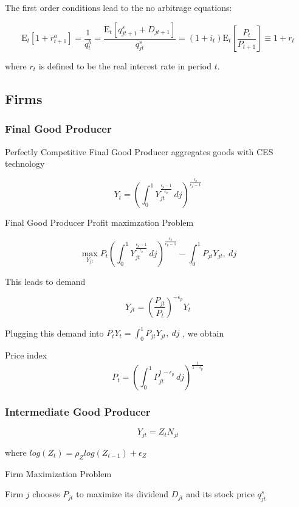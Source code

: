\documentclass[titlepage]{\econtex}\providecommand{\texname}{BufferStockTheory}
\begin{document}
 
The first order conditions lead to the no arbitrage equations:

$$ \mathrm{E}_{t}\left[1+r^{a}_{t+1}\right]= \frac{1}{q^{b}_{t}}  =\frac{\mathrm{E}_{t}\left[q^{s}_{jt+1} + D_{jt+1} \right]}{q^{s}_{jt}} = (1+i_{t}) \mathrm{E}_{t}\left[\frac{P_{t}}{P_{t+1}}\right] \equiv 1 +r_{t}$$

where $r_{t}$ is defined to be the real interest rate in period $t$. 

\hypertarget{Firms}{}
\subsection{Firms}

\hypertarget{Final Good Producer}{}
\subsubsection{Final Good Producer}

Perfectly Competitive Final Good Producer aggregates goods with CES technology

$$ Y_{t} = \left(\int_{0}^{1} Y_{jt}^{\frac{\epsilon_{p}-1}{\epsilon_{p}}}\, dj\right)^{\frac{\epsilon_{p}}{\epsilon_{p}-1}}$$

Final Good Producer Profit maximzation Problem

$$ \max_{Y_{jt}} P_{t} \left(\int_{0}^{1} Y_{jt}^{\frac{\epsilon_{p}-1}{\epsilon_{p}}}\, dj\right)^{\frac{\epsilon_{p}}{\epsilon_{p}-1}} - \int_{0}^{1} P_{jt} Y_{jt} ,\ dj $$


This leads to demand

$$ Y_{jt} = \left(\frac {P_{jt}}{P_{t}}\right)^{- \epsilon_{p}} Y_{t}$$

Plugging this demand into $ P_{t}Y_{t} = \int_{0}^{1} P_{jt} Y_{jt} ,\ dj$ , we obtain

Price index $$P_{t} = \left(\int_{0}^{1} P_{jt}^{1-\epsilon_{p}}\,dj \right )^{\frac{1}{1-\epsilon_{p}}}$$


\hypertarget{Intermediate Good Producer}{}
\subsubsection{Intermediate Good Producer}

$$Y_{jt} =  Z_{t}  N_{jt}$$ 

where $log(Z_{t}) = \rho_{Z} log( Z_{t-1}) + \epsilon_{Z}$


 Firm Maximization Problem
 
 Firm $j$ chooses $P_{jt}$ to maximize its dividend $D_{jt}$ and its stock price $q^{s}_{jt} $
 
\end{document}
